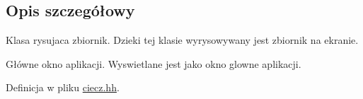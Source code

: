 \subsection{Opis szczegółowy}
Klasa rysujaca zbiornik. Dzieki tej klasie wyrysowywany jest zbiornik na ekranie.

Główne okno aplikacji. Wyswietlane jest jako okno glowne aplikacji.

Definicja w pliku \hyperlink{ciecz_8hh_source}{ciecz.\-hh}.

